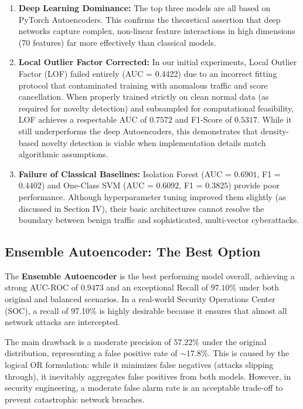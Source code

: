 \begin{enumerate}
  \item \textbf{Deep Learning Dominance:} The top three models are all based on PyTorch Autoencoders. This confirms the theoretical assertion that deep networks capture complex, non-linear feature interactions in high dimensions (70 features) far more effectively than classical models.
  \item \textbf{Local Outlier Factor Corrected:} In our initial experiments, Local Outlier Factor (LOF) failed entirely (AUC = 0.4422) due to an incorrect fitting protocol that contaminated training with anomalous traffic and score cancellation. When properly trained strictly on clean normal data (as required for novelty detection) and subsampled for computational feasibility, LOF achieves a respectable AUC of $0.7572$ and F1-Score of $0.5317$. While it still underperforms the deep Autoencoders, this demonstrates that density-based novelty detection is viable when implementation details match algorithmic assumptions.
  \item \textbf{Failure of Classical Baselines:} Isolation Forest (AUC = $0.6901$, F1 = $0.4402$) and One-Class SVM (AUC = $0.6092$, F1 = $0.3825$) provide poor performance. Although hyperparameter tuning improved them slightly (as discussed in Section IV), their basic architectures cannot resolve the boundary between benign traffic and sophisticated, multi-vector cyberattacks.
\end{enumerate}

\subsection{Ensemble Autoencoder: The Best Option}
The \textbf{Ensemble Autoencoder} is the best performing model overall, achieving a strong AUC-ROC of \textbf{$0.9473$} and an exceptional Recall of \textbf{$97.10\%$} under both original and balanced scenarios. In a real-world Security Operations Center (SOC), a recall of 97.10\% is highly desirable because it ensures that almost all network attacks are intercepted. 

The main drawback is a moderate precision of \textbf{$57.22\%$} under the original distribution, representing a false positive rate of $\sim 17.8\%$. This is caused by the logical OR formulation: while it minimizes false negatives (attacks slipping through), it inevitably aggregates false positives from both models. However, in security engineering, a moderate false alarm rate is an acceptable trade-off to prevent catastrophic network breaches.


